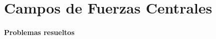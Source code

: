 \documentclass[/home/hernan/Documentos/Apuntes_mecanica_teorica/main.tex]{subfiles}
\begin{document}
    \part{Campos de Fuerzas Centrales}

    \subsection{Problemas resueltos}
    
\end{document}
